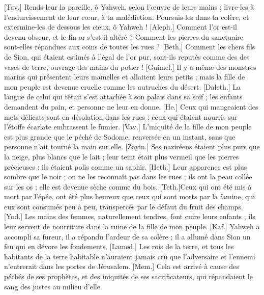 \begin{multicols}{2}
[Tav.] Rends-leur la pareille, ô Yahweh, selon l’œuvre de leurs mains ;
livre-les à l'endurcissement de leur cœur, à ta malédiction.
Poursuis-les dans ta colère, et extermine-les de dessous les cieux, ô Yahweh !
\VerseOne{}[Aleph.] Comment l’or est-il devenu obscur, et le fin or s’est-il altéré ? Comment les pierres du sanctuaire sont-elles répandues aux coins de toutes les rues ?
[Beth.] Comment les chers fils de Sion, qui étaient estimés à l'égal de l'or pur, sont-ils reputés comme des des vases de terre, ouvrage des mains du potier !
[Guimel.] Il y a même des monstres marins qui présentent leurs mamelles et allaitent leurs petits ; mais la fille de mon peuple est devenue cruelle comme les autruches du désert.
[Daleth.] La langue de celui qui têtait s’est attachée à son palais dans sa soif ; les enfants demandent du pain, et personne ne leur en donne.
[He.] Ceux qui mangeaient des mets délicats sont en désolation dans les rues ; ceux qui étaient nourris sur l’étoffe écarlate embrassent le fumier.
[Vav.] L’iniquité de la fille de mon peuple est plus grande que le péché de Sodome, renversée en un instant, sans que personne n’ait tourné la main sur elle.
[Zayin.] Ses naziréens étaient plus purs que la neige, plus blancs que le lait ; leur teint était plus vermeil que les pierres précieuses ; ils étaient polis comme un saphir.
[Heth.] Leur apparence est plus sombre que le noir ; on ne les reconnaît pas dans les rues ; ils ont la peau collée sur les os ; elle est devenue sèche comme du bois.
[Teth.]Ceux qui ont été mis à mort par l’épée, ont été plus heureux que ceux qui sont morts par la famine, qui eux sont consumés peu à peu, transpercés par le défaut du fruit des champs.
[Yod.] Les mains des femmes, naturellement tendres, font cuire leurs enfants ; ils leur servent de nourriture dans la ruine de la fille de mon peuple.
[Kaf.] Yahweh a accompli sa fureur, il a répandu l’ardeur de sa colère ; il a allumé dans Sion un feu qui en dévore les fondements.
[Lamed.] Les rois de la terre, et tous les habitants de la terre habitable n’auraient jamais cru que l’adversaire et l’ennemi n'entrerait dans les portes de Jérusalem.
[Mem.] Cela est arrivé à cause des péchés de ses prophètes, et des iniquités de ses sacrificateurs, qui répandaient le sang des justes au milieu d’elle.

\end{multicols}
